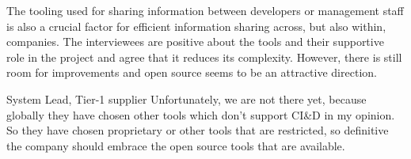 %
%
%
%

 The tooling used for sharing information between developers or management staff is also a crucial factor for efficient information sharing across, but also within, companies. The interviewees are positive about the tools and their supportive role in the project and agree that it reduces its complexity. However, %
there is still room for improvements and open source seems to be an attractive direction.

\begin{aquote}{System Lead, Tier-1 supplier}
Unfortunately, we are not there yet, because globally they have chosen other tools which don't support CI\&D in my opinion. So they have chosen proprietary or other tools that are restricted, so definitive the company should embrace the open source tools that are available.
\end{aquote}

%
%
%
%

